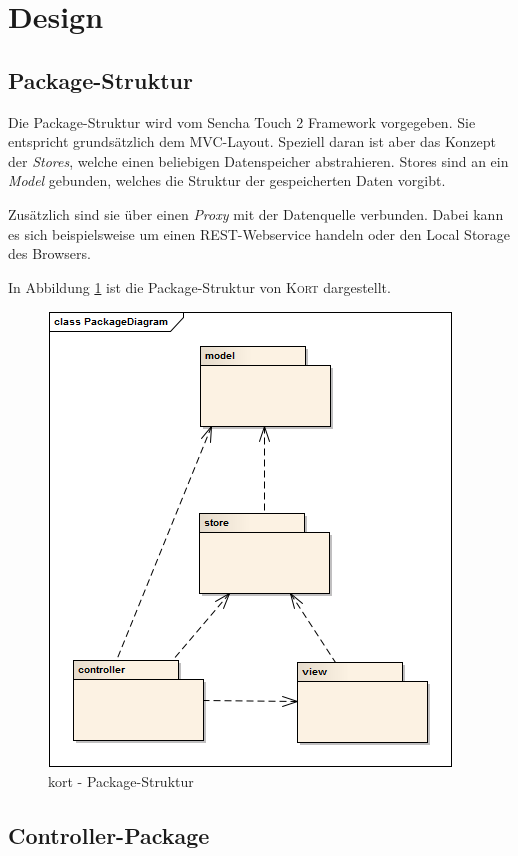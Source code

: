\section{Design}

\subsection{Package-Struktur}

Die Package-Struktur wird vom Sencha Touch 2 Framework vorgegeben. Sie entspricht grundsätzlich dem MVC-Layout.
Speziell daran ist aber das Konzept der \emph{Stores}, welche einen beliebigen Datenspeicher abstrahieren.
Stores sind an ein \emph{Model} gebunden, welches die Struktur der gespeicherten Daten vorgibt.

Zusätzlich sind sie über einen \emph{Proxy} mit der Datenquelle verbunden.
Dabei kann es sich beispielsweise um einen \gls{REST}-Webservice handeln oder den \gls{Local Storage} des Browsers.

In Abbildung \ref{kort-packages} ist die Package-Struktur von \textsc{Kort} dargestellt.

\begin{figure}[H]
	\centering
	\includegraphics[scale=0.7]{images/uml/kort-packagediagram}
	\caption{kort - Package-Struktur}
	\label{kort-packages}
\end{figure}

\subsection{Controller-Package}

